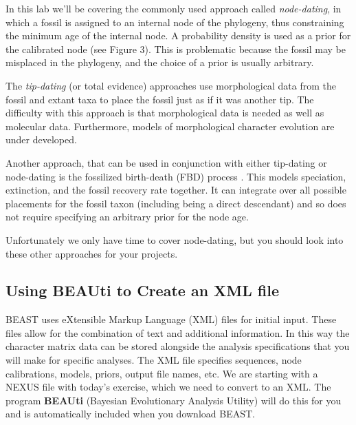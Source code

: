\documentclass[11pt]{article}
\begin{document}
In this lab we'll be covering the commonly used approach
called \textit{node-dating}, in which a fossil is assigned to an internal node
of the phylogeny, thus constraining the minimum age of the internal node.
A probability density is used as a prior for the calibrated node (see Figure 3).
This is problematic because the fossil may be misplaced in the phylogeny,
and the choice of a prior is usually arbitrary.

The \textit{tip-dating} (or total evidence)
approaches use morphological data from the fossil and extant taxa
to place the fossil just as if it was another tip.
The difficulty with this approach is that morphological
data is needed as well as molecular data.
Furthermore, models of morphological character evolution are
under developed.

Another approach, that can be used in conjunction
with either tip-dating or node-dating is the fossilized birth-death (FBD)
process \citep{heath2014fossilized}. This models speciation, extinction, and the fossil recovery rate
together. It can integrate over all possible placements for the
fossil taxon (including being a direct descendant) and so does
not require specifying an arbitrary prior for the node age.

Unfortunately we only have time to cover node-dating, but
you should look into these other approaches for your projects.

\subsection{Using BEAUti to Create an XML file}

BEAST uses eXtensible Markup Language (XML) files for initial input. 
These files allow for the combination of text and additional information. 
In this way the character matrix data can be stored alongside the analysis 
specifications that you will make for specific analyses. 
The XML file specifies sequences, node calibrations, models, priors, 
output file names, etc. 
We are starting with a NEXUS file with today's exercise, 
which we need to convert to an XML. 
The program \textbf{BEAUti} (Bayesian Evolutionary Analysis Utility) 
will do this for you and is automatically included when you download BEAST. 
\end{document}
